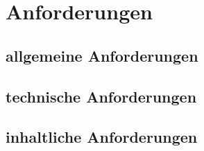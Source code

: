 \section{Anforderungen}

\subsection{allgemeine Anforderungen}

\subsection{technische Anforderungen}

\subsection{inhaltliche Anforderungen}
